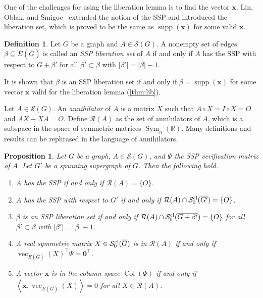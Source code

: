 \documentclass{article}
\newtheorem{proposition}[theorem]{Proposition}
\theoremstyle{definition}
\newtheorem{definition}[theorem]{Definition}
\newcommand{\trans}{^\top}
\newcommand{\inp}[2]{\left\langle#1,#2\right\rangle}
\newcommand{\bzero}{\mathbf{0}}
\newcommand{\bx}{\mathbf{x}}
\newcommand{\Col}{\operatorname{Col}}
\newcommand{\mptn}{\mathcal{S}}
\newcommand{\mptnclo}{\mathcal{S}^{\rm cl}_0}
\newcommand{\msym}[1][n]{\operatorname{Sym}_{#1}(\mathbb{R})}
\newcommand{\vsupp}{\operatorname{supp}}
\newcommand{\mvec}{\operatorname{vec}}
\begin{document}
One of the challenges for using the liberation lemma is to find the vector $\bx$.  Lin, Oblak, and Šmigoc~\cite{LiberationG} extended the notion of the SSP and introduced the liberation set, which is proved to be the same as $\vsupp(\bx)$ for some valid $\bx$.  

\begin{definition} Let $G$ be a graph and $A\in\mptn(G)$. A nonempty set of edges $\beta\subseteq E(\overline{G})$ is called an \emph{SSP liberation set} of $A$ if and
only if $A$ has the SSP with respect to $G + \beta'$ for all $\beta' \subset \beta$ with $|\beta'| = |\beta| - 1$.
\end{definition}

It is shown that \cite[Proposition~2.6]{LiberationG} $\beta$ is an SSP liberation set if and only if $\beta = \vsupp(\bx)$ for some vector $\bx$ valid for the liberation lemma (\cref{thm:lib}).

Let $A\in\mptn(G)$.  An \emph{annihilator} of $A$ is a matrix $X$ such that $A\circ X = I \circ X = O$ and $AX - XA = O$.  Define $\mathcal{R}(A)$ as the set of annihilators of $A$, which is a subspace in the space of symmetric matrices $\msym$. Many definitions and results can be rephrased in the language of annihilators.  

\begin{proposition}
\label{prop:ann}
Let $G$ be a graph, $A\in\mptn(G)$, and $\Psi$ the SSP verification matrix of $A$.  Let $G'$ be a spanning supergraph of $G$.  Then the following hold. 
\begin{enumerate}[label={\rm(\arabic*)}]
\item $A$ has the SSP if and only if $\mathcal{R}(A) = \{O\}$.
\item $A$ has the SSP with respect to $G'$ if and only if $\mathcal{R}(A) \cap \mptnclo(\overline{G'}) = \{O\}$.
\item $\beta$ is an SSP liberation set if and only if $\mathcal{R}(A) \cap \mptnclo(\overline{G + \beta'})= \{O\}$ for all $\beta'\subset\beta$ with $|\beta'| = |\beta| - 1$.
\item A real symmetric matrix $X\in\mptnclo(\overline{G})$ is in $\mathcal{R}(A)$ if and only if $\mvec_{E(\overline{G})}(X)\trans \Psi = \bzero\trans$.
\item A vector $\bx$ is in the column space $\Col(\Psi)$ if and only if $\inp{\bx}{\mvec_{E(\overline{G})}(X)} = 0$ for all $X\in\mathcal{R}(A)$.  
\end{enumerate}
\end{proposition}
\end{document}
